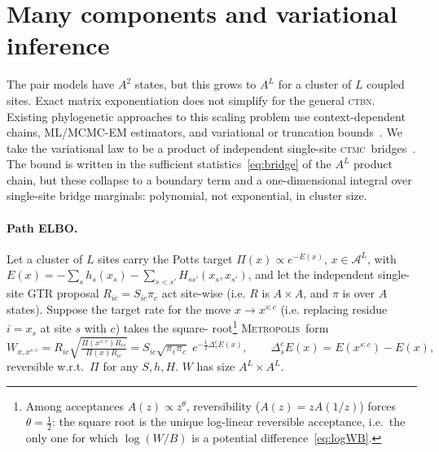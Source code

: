\documentclass{article}
\newcommand{\CTBN}{\textsc{ctbn}}
\newcommand{\CTMC}{\textsc{ctmc}}
\newcommand{\Metrop}{\textsc{Metropolis}}
\newcommand{\Xset}{\mathcal{A}}
\begin{document}
\section{Many components and variational inference}
\label{sec:multi}

The pair models have $A^2$ states, but this grows to $A^L$ for a cluster of $L$ coupled sites. Exact
matrix exponentiation does not simplify for the general \CTBN.
Existing phylogenetic approaches to this scaling problem use context-dependent chains,
ML/MCMC-EM estimators, and variational or truncation
 bounds~\cite{ArndtBurgeHwa2003NeighborDependent,ChristensenHobolthJensen2005PseudoLikelihood,Hobolth2008MCMCEM,JensenPedersen2000ContextDependent,JojicEtAl2004PhyloHMM,LunterHein2004NearestNeighbor,MathewsSchmidler2025ImportanceSampling,MatsenRalph2022BoundingDependency,SiepelHaussler2004ContextML,WexlerGeiger2007VariationalUpper}.
We take the variational law to be a product of independent single-site \CTMC\
bridges~\cite{cohn2010}. The bound is written in the sufficient statistics~\eqref{eq:bridge} of
the $A^L$ product chain, but these collapse to a boundary term and a one-dimensional
integral over single-site bridge marginals: polynomial, not exponential, in cluster size.

\paragraph{Path ELBO.} Let a cluster of $L$ sites carry the Potts target
$\Pi(x)\propto e^{-E(x)}$, $x\in\Xset^L$, with
$E(x)=-\sum_s h_s(x_s)-\sum_{s<s'}H_{ss'}(x_s,x_{s'})$, and let the independent
single-site GTR proposal $R_{ic}=S_{ic}\pi_c$ act site-wise (i.e. $R$ is $A \times A$, and $\pi$ is over $A$ states). 
Suppose the target rate for the move $x\to x^{s:c}$ (i.e. replacing residue $i=x_s$ at site $s$ with $c$) takes the square-
root\footnote{
Among acceptances $A(z)\propto z^\theta$, reversibility ($A(z)=zA(1/z)$) forces
$\theta=\tfrac12$: the square root is the unique log-linear reversible acceptance, i.e.\
the only one for which $\log(W/B)$ is a potential difference~\eqref{eq:logWB}.
}
\Metrop\ form
\begin{equation}\label{eq:sqrtmet}
 W_{x,x^{s:c}}=R_{ic}\sqrt{\tfrac{\Pi(x^{s:c})R_{ci}}{\Pi(x)R_{ic}}}
 =S_{ic}\sqrt{\pi_i\pi_c}\;e^{-\frac12\Delta^c_sE(x)},\qquad
 \Delta^c_sE(x)=E(x^{s:c})-E(x),
\end{equation}
reversible w.r.t.\ $\Pi$ for any $S,h,H$.  $W$ has size $A^L \times A^L$.
\end{document}
